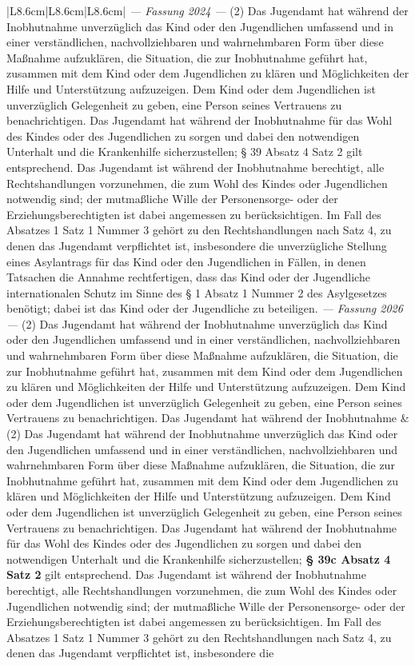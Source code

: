 \documentclass[10pt,a4paper,landscape]{article}
\begin{document}
\begin{longtable}{|L{8.6cm}|L{8.6cm}|L{8.6cm}|}
\textit{--- Fassung 2024 ---} \newline (2) Das Jugendamt hat während der Inobhutnahme unverzüglich das Kind oder den Jugendlichen umfassend und in einer verständlichen, nachvollziehbaren und wahrnehmbaren Form über diese Maßnahme aufzuklären, die Situation, die zur Inobhutnahme geführt hat, zusammen mit dem Kind oder dem Jugendlichen zu klären und Möglichkeiten der Hilfe und Unterstützung aufzuzeigen. Dem Kind oder dem Jugendlichen ist unverzüglich Gelegenheit zu geben, eine Person seines Vertrauens zu benachrichtigen. Das Jugendamt hat während der Inobhutnahme für das Wohl des Kindes oder des Jugendlichen zu sorgen und dabei den notwendigen Unterhalt und die Krankenhilfe sicherzustellen; \S{} 39 Absatz 4 Satz 2 gilt entsprechend. Das Jugendamt ist während der Inobhutnahme berechtigt, alle Rechtshandlungen vorzunehmen, die zum Wohl des Kindes oder Jugendlichen notwendig sind; der mutmaßliche Wille der Personensorge- oder der Erziehungsberechtigten ist dabei angemessen zu berücksichtigen. Im Fall des Absatzes 1 Satz 1 Nummer 3 gehört zu den Rechtshandlungen nach Satz 4, zu denen das Jugendamt verpflichtet ist, insbesondere die unverzügliche Stellung eines Asylantrags für das Kind oder den Jugendlichen in Fällen, in denen Tatsachen die Annahme rechtfertigen, dass das Kind oder der Jugendliche internationalen Schutz im Sinne des \S{} 1 Absatz 1 Nummer 2 des Asylgesetzes benötigt; dabei ist das Kind oder der Jugendliche zu beteiligen. \newline \textit{--- Fassung 2026 ---} \newline (2) Das Jugendamt hat während der Inobhutnahme unverzüglich das Kind oder den Jugendlichen umfassend und in einer verständlichen, nachvollziehbaren und wahrnehmbaren Form über diese Maßnahme aufzuklären, die Situation, die zur Inobhutnahme geführt hat, zusammen mit dem Kind oder dem Jugendlichen zu klären und Möglichkeiten der Hilfe und Unterstützung aufzuzeigen. Dem Kind oder dem Jugendlichen ist unverzüglich Gelegenheit zu geben, eine Person seines Vertrauens zu benachrichtigen. Das Jugendamt hat während der Inobhutnahme & (2) Das Jugendamt hat während der Inobhutnahme unverzüglich das Kind oder den Jugendlichen umfassend und in einer verständlichen, nachvollziehbaren und wahrnehmbaren Form über diese Maßnahme aufzuklären, die Situation, die zur Inobhutnahme geführt hat, zusammen mit dem Kind oder dem Jugendlichen zu klären und Möglichkeiten der Hilfe und Unterstützung aufzuzeigen. Dem Kind oder dem Jugendlichen ist unverzüglich Gelegenheit zu geben, eine Person seines Vertrauens zu benachrichtigen. Das Jugendamt hat während der Inobhutnahme für das Wohl des Kindes oder des Jugendlichen zu sorgen und dabei den notwendigen Unterhalt und die Krankenhilfe sicherzustellen; \textbf{\S{} 39c Absatz 4 Satz 2} gilt entsprechend. Das Jugendamt ist während der Inobhutnahme berechtigt, alle Rechtshandlungen vorzunehmen, die zum Wohl des Kindes oder Jugendlichen notwendig sind; der mutmaßliche Wille der Personensorge- oder der Erziehungsberechtigten ist dabei angemessen zu berücksichtigen. Im Fall des Absatzes 1 Satz 1 Nummer 3 gehört zu den Rechtshandlungen nach Satz 4, zu denen das Jugendamt verpflichtet ist, insbesondere die 
\end{longtable}
\end{document}
